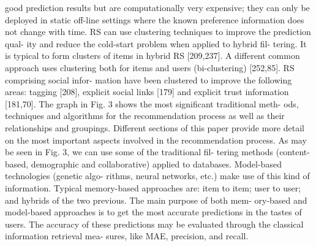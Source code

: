 \documentclass[11pt]{article}
\begin{document}
good prediction results but are computationally very expensive;
they can only be deployed in static off-line settings where the
known preference information does not change with time.
RS can use clustering techniques to improve the prediction qual-
ity and reduce the cold-start problem when applied to hybrid fil-
tering. It is typical to form clusters of items in hybrid RS
[209,237]. A different common approach uses clustering both for
items and users (bi-clustering) [252,85]. RS comprising social infor-
mation have been clustered to improve the following areas: tagging
[208], explicit social links [179] and explicit trust information
[181,70].
The graph in Fig. 3 shows the most significant traditional meth-
ods, techniques and algorithms for the recommendation process as
well as their relationships and groupings. Different sections of this
paper provide more detail on the most important aspects involved
in the recommendation process.
As may be seen in Fig. 3, we can use some of the traditional fil-
tering methods (content-based, demographic and collaborative)
applied to databases. Model-based technologies (genetic algo-
rithms, neural networks, etc.) make use of this kind of information.
Typical memory-based approaches are: item to item; user to user;
and hybrids of the two previous. The main purpose of both mem-
ory-based and model-based approaches is to get the most accurate
predictions in the tastes of users. The accuracy of these predictions
may be evaluated through the classical information retrieval mea-
sures, like MAE, precision, and recall.
\end{document}
